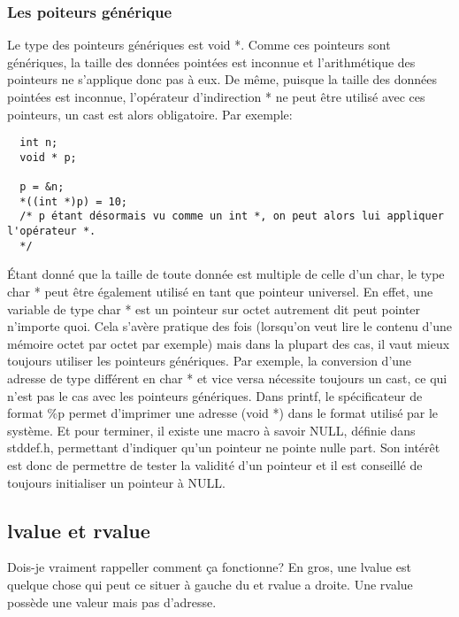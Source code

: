 \documentclass[a4paper]{article}
\begin{document}
\subsubsection{Les poiteurs générique}
 Le type des pointeurs génériques est void *. Comme ces pointeurs sont génériques, la taille des données pointées est inconnue et l'arithmétique des pointeurs ne s'applique donc pas à eux. De même, puisque la taille des données pointées est inconnue, l'opérateur d'indirection * ne peut être utilisé avec ces pointeurs, un cast est alors obligatoire. Par exemple:
\begin{lstlisting}
  int n;
  void * p;
  
  p = &n;
  *((int *)p) = 10;
  /* p étant désormais vu comme un int *, on peut alors lui appliquer l'opérateur *.
  */ 
\end{lstlisting}
Étant donné que la taille de toute donnée est multiple de celle d'un char, le type char * peut être également utilisé en tant que pointeur universel. En effet, une variable de type char * est un pointeur sur octet autrement dit peut pointer n'importe quoi. Cela s'avère pratique des fois (lorsqu'on veut lire le contenu d'une mémoire octet par octet par exemple) mais dans la plupart des cas, il vaut mieux toujours utiliser les pointeurs génériques. Par exemple, la conversion d'une adresse de type différent en char * et vice versa nécessite toujours un cast, ce qui n'est pas le cas avec les pointeurs génériques.\newline
Dans printf, le spécificateur de format \%p permet d'imprimer une adresse (void *) dans le format utilisé par le système.\newline
Et pour terminer, il existe une macro à savoir NULL, définie dans stddef.h, permettant d'indiquer qu'un pointeur ne pointe nulle part. Son intérêt est donc de permettre de tester la validité d'un pointeur et il est conseillé de toujours initialiser un pointeur à NULL.

\subsection{lvalue et rvalue}
Dois-je vraiment rappeller comment ça fonctionne?
En gros, une lvalue est quelque chose qui peut ce situer à gauche du \guillemotleft{=}\guillemotright{} et rvalue a droite. Une rvalue possède une valeur mais pas d'adresse.
\end{document}
